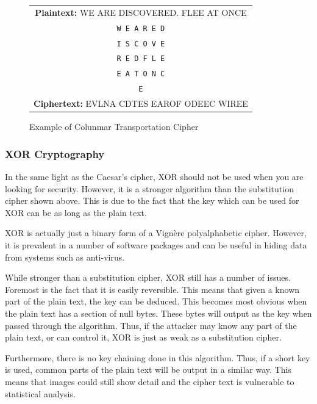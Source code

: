 				\begin{figure}[htb]
					\centering
					\begin{tabular}{|c|}
						\hline
						\textbf{Plaintext:}  WE ARE DISCOVERED. FLEE AT ONCE \\ 
						\texttt{W\,E\,A\,R\,E\,D} \\
						\texttt{I\,S\,C\,O\,V\,E} \\
						\texttt{R\,E\,D\,F\,L\,E} \\
						\texttt{E\,A\,T\,O\,N\,C} \\
						\texttt{E\thinspace\hphantom{A\,T\,O\,N\,C}}	\\
						\textbf{Ciphertext:} EVLNA CDTES EAROF ODEEC WIREE \\ 
						\hline
					\end{tabular}
					\caption{Example of Colunmar Transportation Cipher}
					\label{fig:ColumnarTransportation}
				\end{figure}

			\subsubsection{XOR Cryptography}
				In the same light as the Caesar's cipher, XOR should not be used when you are looking for security. 
				However, it is a stronger algorithm than the substitution cipher shown above. 
				This is due to the fact that the key which can be used for XOR can be as long as the plain text. 

				XOR is actually just a binary form of a Vign\`{e}re polyalphabetic cipher. 
				However, it is prevalent in a number of software packages and can be useful in hiding data from systems such as anti-virus. 

				While stronger than a substitution cipher, XOR still has a number of issues. 
				Foremost is the fact that it is easily reversible. 
				This means that given a known part of the plain text, the key can be deduced. 
				This becomes most obvious when the plain text has a section of null bytes. 
				These bytes will output as the key when passed through the algorithm. 
				Thus, if the attacker may know any part of the plain text, or can control it, XOR is just as weak as a substitution cipher. 

				Furthermore, there is no key chaining done in this algorithm. 
				Thus, if a short key is used, common parts of the plain text will be output in a similar way. 
				This means that images could still show detail and the cipher text is vulnerable to statistical analysis. 

